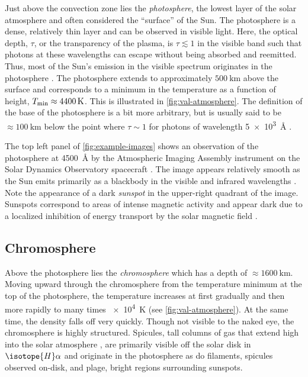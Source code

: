 Just above the convection zone lies the \textit{photosphere}, the lowest layer of the solar atmosphere and often considered the ``surface'' of the Sun. The photosphere is a dense, relatively thin layer and can be observed in visible light. Here, the optical depth, $\tau$, or the transparency of the plasma, is $\tau\lesssim1$ in the visible band such that photons at these wavelengths can escape without being absorbed and reemitted. Thus, most of the Sun's emission in the visible spectrum originates in the photosphere \citep{priest_magnetohydrodynamics_2014}. The photosphere extends to approximately $\SI{500}{\km}$ above the surface and corresponds to a minimum in the temperature as a function of height, $T_\textup{min}\approx\SI{4400}{\kelvin}$. This is illustrated in \autoref{fig:val-atmosphere}. The definition of the base of the photosphere is a bit more arbitrary, but is usually said to be $\approx\SI{100}{\km}$ below the point where $\tau\sim1$ for photons of wavelength \SI{5e3}{\angstrom} \citep{carroll_introduction_2007}. 

The top left panel of \autoref{fig:example-images} shows an observation of the photosphere at \SI{4500}{\angstrom} by the Atmospheric Imaging Assembly instrument \citep[AIA,][]{lemen_atmospheric_2012} on the Solar Dynamics Observatory spacecraft \citep[SDO,][]{pesnell_solar_2012}. The image appears relatively smooth as the Sun emits primarily as a blackbody in the visible and infrared wavelengths \citep{carroll_introduction_2007}. Note the appearance of a dark \textit{sunspot} in the upper-right quadrant of the image. Sunspots correspond to areas of intense magnetic activity and appear dark due to a localized inhibition of energy transport by the solar magnetic field \citep{priest_magnetohydrodynamics_2014}.

\subsection{Chromosphere}\label{sec:chromosphere}

Above the photosphere lies the \textit{chromosphere} which has a depth of $\approx\SI{1600}{\km}$. Moving upward through the chromosphere from the temperature minimum at the top of the photosphere, the temperature increases at first gradually and then more rapidly to many times \SI{e4}{\kelvin} (see \autoref{fig:val-atmosphere}). At the same time, the density falls off very quickly. Though not visible to the naked eye, the chromosphere is highly structured. Spicules, tall columns of gas that extend high into the solar atmosphere \citep{de_pontieu_origins_2011}, are primarily visible off the solar disk in $\isotope{H}\alpha$ and originate in the photosphere as do filaments, spicules observed on-disk, and plage, bright regions surrounding sunspots.

